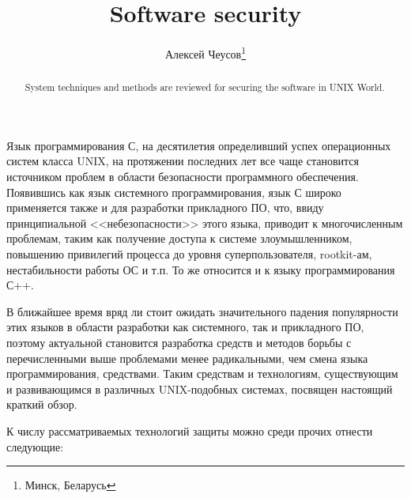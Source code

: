 \documentclass[10pt, a5paper]{article}
\begin{document}
\title{Software security}%

\author{Алексей Чеусов\footnote{Минск, Беларусь}}
\maketitle

\begin{abstract}
System techniques and methods are reviewed for securing the software in UNIX World.
\end{abstract}

Язык программирования С, на десятилетия определивший успех операционных систем класса UNIX, на протяжении последних лет все чаще
становится источником проблем в области безопасности программного
обеспечения. Появившись как язык системного программирования, язык С
широко применяется также и для разработки прикладного ПО, что, ввиду принципиальной <<небезопасности>> этого языка, приводит к многочисленным проблемам, таким как получение доступа к системе злоумышленником, повышению привилегий процесса до уровня суперпользователя, rootkit-ам, нестабильности работы ОС и т.п. То же относится и к языку программирования С++.

В ближайшее время вряд ли стоит ожидать значительного падения популярности этих языков в области разработки как системного, так и прикладного ПО, поэтому
актуальной становится разработка средств и методов борьбы с
перечисленными выше проблемами менее радикальными, чем смена языка
программирования, средствами. Таким средствам и технологиям, существующим и развивающимся в различных UNIX-подобных системах, посвящен настоящий краткий обзор.

К числу рассматриваемых технологий защиты можно среди прочих отнести следующие:
\end{document}
